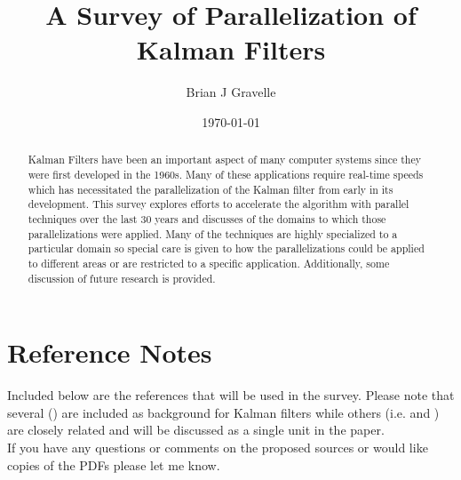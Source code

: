 \documentclass[12pt]{article}
\title{A Survey of Parallelization of Kalman Filters}
\author{
       Brian J Gravelle 
}
\date{\today}
\begin{document}
\maketitle

\begin{abstract}
Kalman Filters have been an important aspect of many computer systems since they were first developed in the 1960s. Many of these applications require real-time speeds which has necessitated the parallelization of the Kalman filter from early in its development. This survey explores efforts to accelerate the algorithm with parallel techniques over the last 30 years  and discusses of the domains to which those parallelizations were applied. Many of the techniques are highly specialized to a particular domain so special care is given to how the parallelizations could be applied to different areas or are restricted to a specific application. Additionally, some discussion of future research is provided.
\end{abstract}

\section{Reference Notes}
Included below are the references that will be used in the survey. Please note that several (\cite{blackman1986multiple, welch1995introduction, budhiraja2007survey, kalman1960new})  are included as background for Kalman filters while others (i.e. \cite{cerati2015kalman, cerati2016kalman, cerati2015traditional} and \cite{rao1991fully, spanos2005distributed, spanos2005approximate}) are closely related and will be discussed as a single unit in the paper.\\

If you have any questions or comments on the proposed sources or would like copies of the PDFs please let me know.

\nocite{*}



\end{document}

